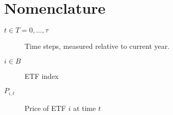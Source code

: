 \section{Nomenclature}
\begin{description}
\item[$t \in T = {0, \ldots, \tau}$]{Time steps, measured relative to current year.}
\item[$i \in B$]{ETF index}
\item[$P_{i,t}$]{Price of ETF $i$ at time $t$}
\end{description}
